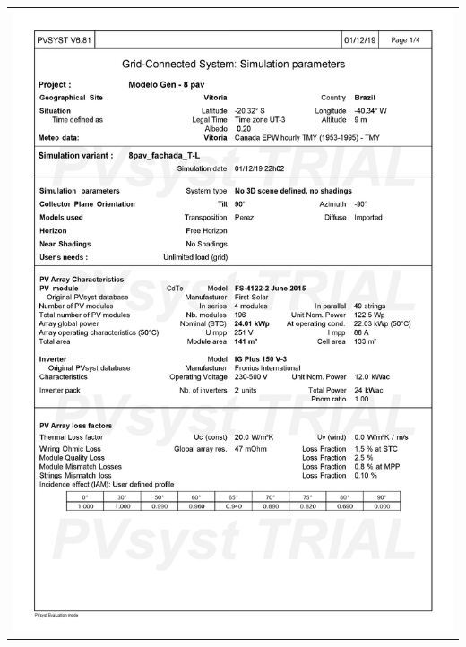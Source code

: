 \begin{table}[H]
    \centering
    \begin{tabular}{l}
        \includegraphics[width=\textwidth]{figures/attachments/resultpv9.jpg}
    \end{tabular}
\end{table}
\pagebreak
